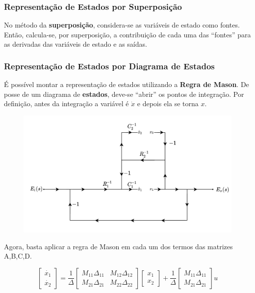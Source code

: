 \documentclass{article}
\numberwithin{equation}{section}
\begin{document}
\subsubsection{Representação de Estados por Superposição}
\label{subsubsec:est_superposição}
No método da \textbf{superposição}, considera-se as variáveis de estado como fontes. Então, calcula-se, por superposição, a contribuição de cada uma das ``fontes'' para as derivadas das variáveis de estado e as saídas.

\subsubsection{Representação de Estados por Diagrama de Estados}
\label{subsubsec:est_mason}
É possível montar a representação de estados utilizando a \textbf{Regra de Mason}. De posse de um diagrama de \textbf{estados}, deve-se ``abrir'' os pontos de integração. Por definição, antes da integração a variável é $\dot x$ e depois ela se torna $x$.

\begin{figure}[H]
    \centering
    \includegraphics[width=\textwidth]{img/mason/exemplo_estados}
\end{figure}

Agora, basta aplicar a regra de Mason em cada um dos termos das matrizes A,B,C,D.

\begin{equation*}
    \begin{bmatrix}
        \dot{x_{1}}  \\
        \dot{x_{2}}
    \end{bmatrix}
    = \frac{1}{\Delta} %
    \begin{bmatrix}
        M_{11}\Delta_{11} & M_{12}\Delta_{12}\\
        M_{21}\Delta_{21} & M_{22}\Delta_{22}
    \end{bmatrix}
    \begin{bmatrix}
        x_{1} \\
        x_{2}
    \end{bmatrix}
    + \frac{1}{\Delta}%
    \begin{bmatrix}
        M_{11}\Delta_{11}\\
        M_{21}\Delta_{21}
    \end{bmatrix}
    u
\end{equation*}
\end{document}

